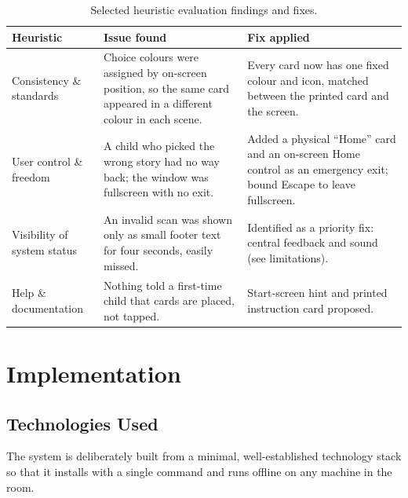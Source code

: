 \begin{table}[htbp]
\centering
\caption{Selected heuristic evaluation findings and fixes.}
\label{tab:heuristics}
\small
\begin{tabular}{@{}p{3.1cm}p{5.3cm}p{5.3cm}@{}}
\toprule
\textbf{Heuristic} & \textbf{Issue found} & \textbf{Fix applied} \\
\midrule
Consistency \& standards &
Choice colours were assigned by on-screen position, so the same card appeared
in a different colour in each scene. &
Every card now has one fixed colour and icon, matched between the printed
card and the screen. \\
\addlinespace
User control \& freedom &
A child who picked the wrong story had no way back; the window was fullscreen
with no exit. &
Added a physical ``Home'' card and an on-screen Home control as an emergency
exit; bound Escape to leave fullscreen. \\
\addlinespace
Visibility of system status &
An invalid scan was shown only as small footer text for four seconds, easily
missed. &
Identified as a priority fix: central feedback and sound (see
limitations). \\
\addlinespace
Help \& documentation &
Nothing told a first-time child that cards are placed, not tapped. &
Start-screen hint and printed instruction card proposed. \\
\bottomrule
\end{tabular}
\end{table}

\section{Implementation}

\subsection{Technologies Used}
The system is deliberately built from a minimal, well-established technology
stack so that it installs with a single command and runs offline on any
machine in the room.


